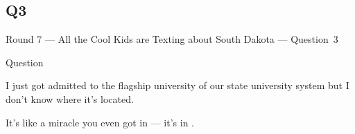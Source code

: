 \documentclass[11pt]{beamer}
\begin{document}
\subsection*{Q3}
\begin{frame}[t]{Round 7 --- All the Cool Kids are Texting about South Dakota --- \mbox{Question 3}}
\begin{block}{Question}

\begin{minipage}{0.9\textwidth}
\begin{mdframed}[
    roundcorner=7pt,
    backgroundcolor=black!5,
    linecolor=black!5,
    fontcolor=black,
    ignorelastdescenders]
\begin{flushleft}
{\small{}\selectfont{}
I just got admitted to the flagship university of our state university system but I don't know where it's located.
}
\end{flushleft}
\end{mdframed}
\end{minipage}

\hfill{}\begin{minipage}{0.9\textwidth}
\begin{mdframed}[
    roundcorner=7pt,
    backgroundcolor=blue!80!white,
    linecolor=blue!80!white,
    fontcolor=white,
    ignorelastdescenders]
\begin{flushleft}
{\small{}\selectfont{}
It's like a miracle you even got in --- it's in \textunderscore{}\textunderscore{}\textunderscore{}\textunderscore{}\textunderscore{}\textunderscore{}.
}
\end{flushleft}
\end{mdframed}
\end{minipage}
\end{block}
\end{frame}
\end{document}
